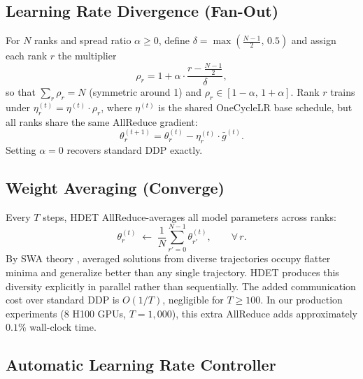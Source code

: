 \documentclass{article}
\begin{document}
\subsection{Learning Rate Divergence (Fan-Out)}
\label{sec:fanout}

For $N$ ranks and spread ratio $\alpha \geq 0$, define
$\delta = \max\!\left(\tfrac{N-1}{2},\, 0.5\right)$ and assign each rank $r$ the multiplier
\begin{equation}
  \rho_r = 1 + \alpha \cdot \frac{r - \frac{N-1}{2}}{\delta},
  \label{eq:rho}
\end{equation}
so that $\sum_r \rho_r = N$ (symmetric around 1) and $\rho_r \in [1{-}\alpha,\,1{+}\alpha]$.
Rank $r$ trains under $\eta_r^{(t)} = \eta^{(t)} \cdot \rho_r$, where $\eta^{(t)}$
is the shared OneCycleLR base schedule, but all ranks share the same AllReduce gradient:
\begin{equation}
  \theta_r^{(t+1)} = \theta_r^{(t)} - \eta_r^{(t)} \cdot \bar{g}^{(t)}.
  \label{eq:rank_lr}
\end{equation}
Setting $\alpha{=}0$ recovers standard DDP exactly.

\subsection{Weight Averaging (Converge)}
\label{sec:converge}

Every $T$ steps, HDET AllReduce-averages all model parameters across ranks:
\begin{equation}
  \theta_r^{(t)} \;\leftarrow\; \frac{1}{N}\sum_{r'=0}^{N-1} \theta_{r'}^{(t)},
  \qquad \forall\, r.
  \label{eq:avg}
\end{equation}
By SWA theory \citep{izmailov2018averaging}, averaged solutions from diverse
trajectories occupy flatter minima and generalize better than any single trajectory.
HDET produces this diversity explicitly in parallel rather than sequentially.
The added communication cost over standard DDP is $O(1/T)$, negligible for $T \geq 100$.
In our production experiments (8 H100 GPUs, $T{=}1{,}000$), this extra AllReduce adds
approximately $0.1\%$ wall-clock time.

\subsection{Automatic Learning Rate Controller}
\label{sec:autolr}
\end{document}
